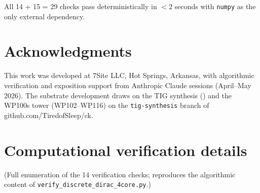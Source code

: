 \documentclass[11pt]{amsart}
\theoremstyle{plain}
\theoremstyle{definition}
\theoremstyle{remark}
\begin{document}
All 14 + 15 = 29 checks pass deterministically in $<2$ seconds with
\texttt{numpy} as the only external dependency.

\section*{Acknowledgments}

This work was developed at 7Site LLC, Hot Springs, Arkansas, with
algorithmic verification and exposition support from Anthropic Claude
sessions (April--May 2026). The substrate development draws on the TIG
synthesis (\cite{TIGsynthesis2026}) and the WP100s tower (WP102--WP116) on
the \texttt{tig-synthesis} branch of github.com/TiredofSleep/ck.

\appendix
\section{Computational verification details}
\label{app:proofs}

(Full enumeration of the 14 verification checks; reproduces the
algorithmic content of \texttt{verify\_discrete\_dirac\_4core.py}.)
\end{document}
